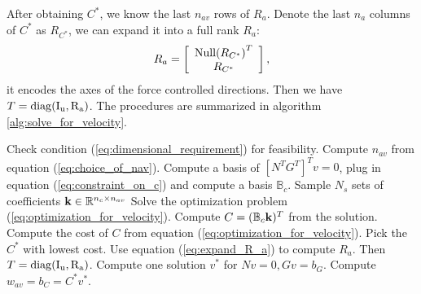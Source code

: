 After obtaining $C^*$, we know the last $n_{av}$ rows of $R_a$. Denote the last $n_a$ columns of $C^*$ as $R_{C^*}$, we can expand it into a full rank $R_a$:
\begin{equation}
\label{eq:expand_R_a}
{R_a} = \left[ {\begin{array}{*{20}{c}}
{{\rm Null}{{({R_{C^*}})}^T}}\\
{{R_{C^*}}}
\end{array}} \right],
\end{equation}
it encodes the axes of the force controlled directions. Then we have $T=\rm{diag}(I_u, R_a)$.
The procedures are summarized in algorithm \ref{alg:solve_for_velocity}.
\begin{algorithm}[h]
\caption{Solve for velocity controlled actions}  \label{alg:solve_for_velocity}
\begin{algorithmic}[1]
\STATE Check condition (\ref{eq:dimensional_requirement}) for feasibility.
\STATE Compute $n_{av}$ from equation (\ref{eq:choice_of_nav}).
\STATE Compute a basis of $[N^T G^T]^Tv=0$, plug in equation (\ref{eq:constraint_on_c}) and compute a basis $\mathbb{B}_c$.
\STATE Sample $N_s$ sets of coefficients ${\bf k}\in\mathbb{R}^{n_c\times n_{av}}$
\STATE Solve the optimization problem (\ref{eq:optimization_for_velocity}).
\STATE Compute $C=(\mathbb{B}_c{\bf k})^T$ from the solution.
\STATE Compute the cost of $C$ from equation (\ref{eq:optimization_for_velocity}).
\ENDFOR
\STATE Pick the $C^*$ with lowest cost.
\STATE Use equation (\ref{eq:expand_R_a}) to compute $R_a$. Then $T=\rm{diag}(I_u, R_a)$.
\STATE Compute one solution $v^*$ for $Nv=0, Gv=b_G$.
\STATE Compute $w_{av}=b_C=C^*v^*$.
\end{algorithmic}
\end{algorithm}

